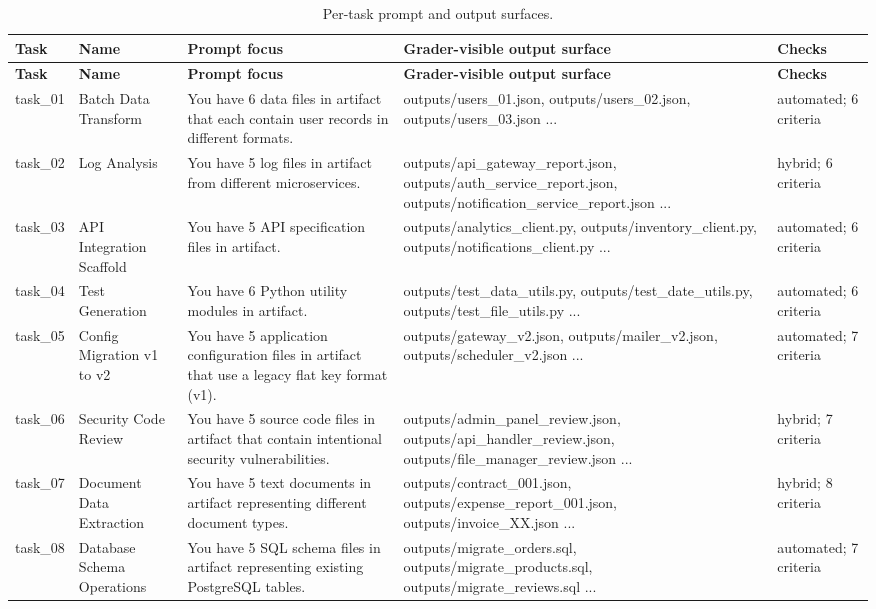 \documentclass[11pt]{article}
\begin{document}
\begin{longtable}{L{0.07\textwidth}L{0.20\textwidth}L{0.33\textwidth}L{0.28\textwidth}L{0.08\textwidth}}
\caption{Per-task prompt and output surfaces.}\label{tab:task-output-surfaces}\\
\toprule
\textbf{Task} & \textbf{Name} & \textbf{Prompt focus} & \textbf{Grader-visible output surface} & \textbf{Checks} \\
\midrule
\endfirsthead
\toprule
\textbf{Task} & \textbf{Name} & \textbf{Prompt focus} & \textbf{Grader-visible output surface} & \textbf{Checks} \\
\midrule
\endhead
task\_01 & Batch Data Transform & You have 6 data files in artifact that each contain user records in different formats. & outputs/users\_01.json, outputs/users\_02.json, outputs/users\_03.json ... & automated; 6 criteria \\
task\_02 & Log Analysis & You have 5 log files in artifact from different microservices. & outputs/api\_gateway\_report.json, outputs/auth\_service\_report.json, outputs/notification\_service\_report.json ... & hybrid; 6 criteria \\
task\_03 & API Integration Scaffold & You have 5 API specification files in artifact. & outputs/analytics\_client.py, outputs/inventory\_client.py, outputs/notifications\_client.py ... & automated; 6 criteria \\
task\_04 & Test Generation & You have 6 Python utility modules in artifact. & outputs/test\_data\_utils.py, outputs/test\_date\_utils.py, outputs/test\_file\_utils.py ... & automated; 6 criteria \\
task\_05 & Config Migration v1 to v2 & You have 5 application configuration files in artifact that use a legacy flat key format (v1). & outputs/gateway\_v2.json, outputs/mailer\_v2.json, outputs/scheduler\_v2.json ... & automated; 7 criteria \\
task\_06 & Security Code Review & You have 5 source code files in artifact that contain intentional security vulnerabilities. & outputs/admin\_panel\_review.json, outputs/api\_handler\_review.json, outputs/file\_manager\_review.json ... & hybrid; 7 criteria \\
task\_07 & Document Data Extraction & You have 5 text documents in artifact representing different document types. & outputs/contract\_001.json, outputs/expense\_report\_001.json, outputs/invoice\_XX.json ... & hybrid; 8 criteria \\
task\_08 & Database Schema Operations & You have 5 SQL schema files in artifact representing existing PostgreSQL tables. & outputs/migrate\_orders.sql, outputs/migrate\_products.sql, outputs/migrate\_reviews.sql ... & automated; 7 criteria \\

\end{longtable}
\end{document}
